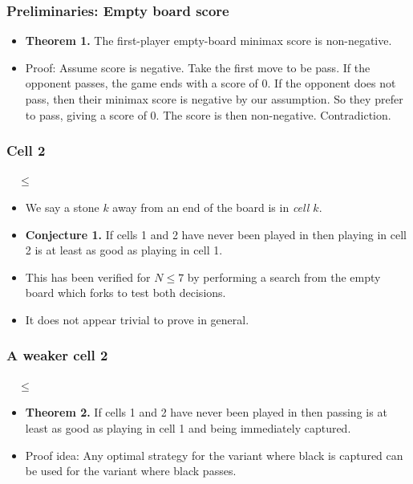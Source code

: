 \documentclass{beamer}
\begin{document}
    \begin{frame}
        \frametitle{Preliminaries: Empty board score}
        \begin{itemize}
            \item \textbf{Theorem 1.} The first-player empty-board minimax score is non-negative.
            \item Proof: Assume score is negative. Take the first move to be
                pass. If the opponent passes, the game ends with a score of
                0. If the opponent does not pass, then their minimax score is
                negative by our assumption. So they prefer to pass, giving a
                score of 0. The score is then non-negative. Contradiction.
        \end{itemize}
    \end{frame}

    \begin{frame}
        \frametitle{Cell 2}
        \begin{center}
            \cleargoban
            \showgoban[b2,k2]\ \ $\leq$
            \cleargoban
            \showgoban[b2,k2]
        \end{center}
        \begin{itemize}
            \item We say a stone $k$ away from an end of the board is in \textit{cell $k$}.
            \item \textbf{Conjecture 1.} If cells 1 and 2 have never been played
                in then playing in cell 2 is at least as good as playing in cell 1.
            \pause
            \item This has been verified for $N \leq 7$ by performing a search from the empty board which forks
                to test both decisions.
            \item It does not appear trivial to prove in general.
        \end{itemize}
    \end{frame}

    \begin{frame}
        \frametitle{A weaker cell 2}
        \begin{center}
            \cleargoban
            \showgoban[b2,k2]\ \ $\leq$
            \cleargoban
            \showgoban[b2,k2]
        \end{center}
        \begin{itemize}
            \item \textbf{Theorem 2.} If cells 1 and 2 have never been played
                in then passing is at least as good as playing in cell 1 and being immediately captured.
            \pause
            \item Proof idea: Any optimal strategy for the variant where black is captured can be used for the variant where black passes.
        \end{itemize}
    \end{frame}
\end{document}
